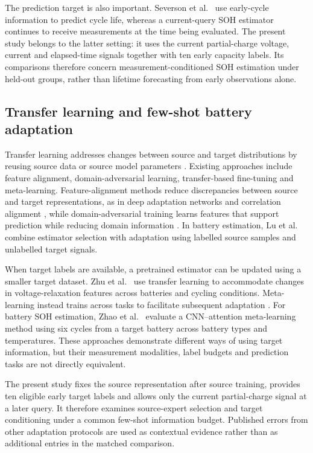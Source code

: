 \documentclass[preprint,12pt]{elsarticle}
\begin{document}
The prediction target is also important. Severson et al.\ \citep{severson2019} use early-cycle information to predict cycle life, whereas a current-query SOH estimator continues to receive measurements at the time being evaluated. The present study belongs to the latter setting: it uses the current partial-charge voltage, current and elapsed-time signals together with ten early capacity labels. Its comparisons therefore concern measurement-conditioned SOH estimation under held-out groups, rather than lifetime forecasting from early observations alone.

\subsection{Transfer learning and few-shot battery adaptation}
Transfer learning addresses changes between source and target distributions by reusing source data or source model parameters \citep{pan2010}. Existing approaches include feature alignment, domain-adversarial learning, transfer-based fine-tuning and meta-learning. Feature-alignment methods reduce discrepancies between source and target representations, as in deep adaptation networks and correlation alignment \citep{long2015,sun2016}, while domain-adversarial training learns features that support prediction while reducing domain information \citep{ganin2016}. In battery estimation, Lu et al.\ \citep{lu2023} combine estimator selection with adaptation using labelled source samples and unlabelled target signals.

When target labels are available, a pretrained estimator can be updated using a smaller target dataset. Zhu et al.\ \citep{zhu2022} use transfer learning to accommodate changes in voltage-relaxation features across batteries and cycling conditions. Meta-learning instead trains across tasks to facilitate subsequent adaptation \citep{finn2017}. For battery SOH estimation, Zhao et al.\ \citep{zhao2025} evaluate a CNN--attention meta-learning method using six cycles from a target battery across battery types and temperatures. These approaches demonstrate different ways of using target information, but their measurement modalities, label budgets and prediction tasks are not directly equivalent.

The present study fixes the source representation after source training, provides ten eligible early target labels and allows only the current partial-charge signal at a later query. It therefore examines source-expert selection and target conditioning under a common few-shot information budget. Published errors from other adaptation protocols are used as contextual evidence rather than as additional entries in the matched comparison.
\end{document}
